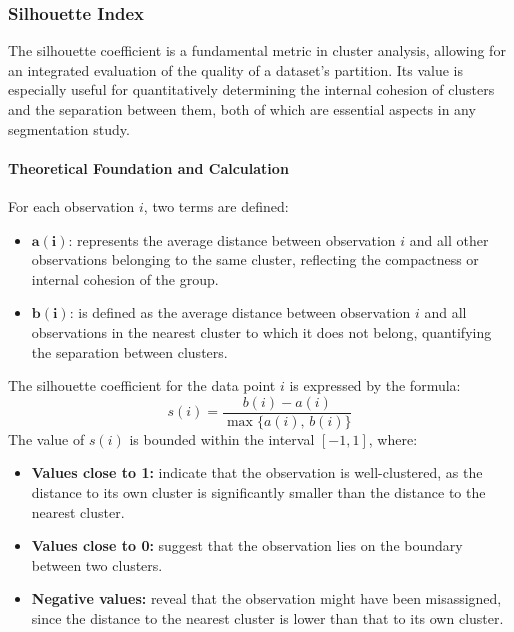 \documentclass[10pt]{article}
\begin{document}
\subsubsection{Silhouette Index}

The silhouette coefficient is a fundamental metric in cluster analysis, allowing for an integrated evaluation of the quality of a dataset's partition. Its value is especially useful for quantitatively determining the internal cohesion of clusters and the separation between them, both of which are essential aspects in any segmentation study.

\paragraph{Theoretical Foundation and Calculation}  
For each observation \( i \), two terms are defined:
\begin{itemize}
    \item \(\boldsymbol{a(i)}\): represents the average distance between observation \( i \) and all other observations belonging to the same cluster, reflecting the compactness or internal cohesion of the group.
    \item \(\boldsymbol{b(i)}\): is defined as the average distance between observation \( i \) and all observations in the nearest cluster to which it does not belong, quantifying the separation between clusters.
\end{itemize}

The silhouette coefficient for the data point \( i \) is expressed by the formula:
\[
s(i) = \frac{b(i) - a(i)}{\max\{a(i),\, b(i)\}}
\]
The value of \( s(i) \) is bounded within the interval \([-1, 1]\), where:
\begin{itemize}
    \item \textbf{Values close to 1:} indicate that the observation is well-clustered, as the distance to its own cluster is significantly smaller than the distance to the nearest cluster.
    \item \textbf{Values close to 0:} suggest that the observation lies on the boundary between two clusters.
    \item \textbf{Negative values:} reveal that the observation might have been misassigned, since the distance to the nearest cluster is lower than that to its own cluster.
\end{itemize}
\end{document}
